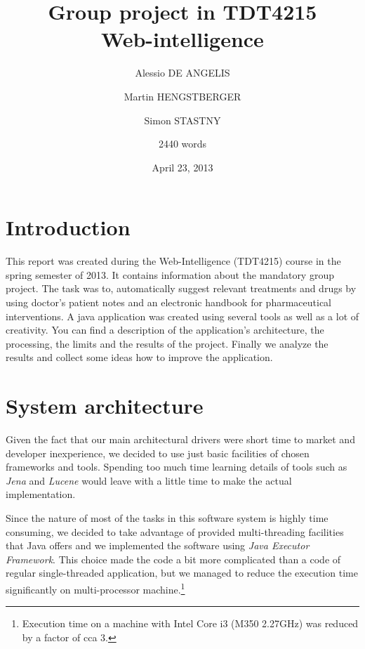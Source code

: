 \documentclass{article}
\begin{document}
\title{Group project in TDT4215\\
Web-intelligence}

\date{April 23, 2013}

\author{
  Alessio DE ANGELIS\and 
  Martin HENGSTBERGER\and
  Simon STASTNY\and 
	2440 words}

\maketitle

\tableofcontents
\newpage


\section{Introduction}

This report was created during the Web-Intelligence (TDT4215) course in the spring semester of 2013. It contains information about the mandatory group project. The task was to, automatically suggest relevant treatments and drugs by using doctor's patient notes and an electronic handbook for pharmaceutical interventions. A java application was created using several tools as well as a lot of creativity. You can find a description of the application's architecture, the processing, the limits and the results of the project. Finally we analyze the results and collect some ideas how to improve the application.

\section{System architecture}

Given the fact that our main architectural drivers were short time to market and developer inexperience, we decided to use just basic facilities of chosen frameworks and tools. Spending too much time learning details of tools such as \emph{Jena} and \emph{Lucene} would leave with a little time to make the actual implementation.

Since the nature of most of the tasks in this software system is highly time consuming, we decided to take advantage of provided multi-threading facilities that Java offers and we implemented the software using \emph{Java Executor Framework}. This choice made the code a bit more complicated than a code of regular single-threaded application, but we managed to reduce the execution time significantly on multi-processor machine.\footnote{Execution time on a machine with Intel Core i3 (M350 2.27GHz) was reduced by a factor of cca 3.}
\end{document}

